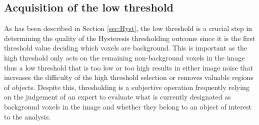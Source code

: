 \subsection{Acquisition of the low threshold}\label{sec:low_acquis}
As has been described in Section \ref{sec:Hyst}, the low threshold is a crucial step in determining the quality of the Hysteresis thresholding outcome since it is the first threshold value deciding which voxels are background. This is important as the high threshold only acts on the remaining non-background voxels in the image thus a low threshold that is too low or too high results in either image noise that increases the difficulty of the high threshold selection or removes valuable regions of objects. Despite this, thresholding is a subjective operation frequently relying on the judgement of an expert to evaluate what is currently designated as background voxels in the image and whether they belong to an object of interest to the analysis.
